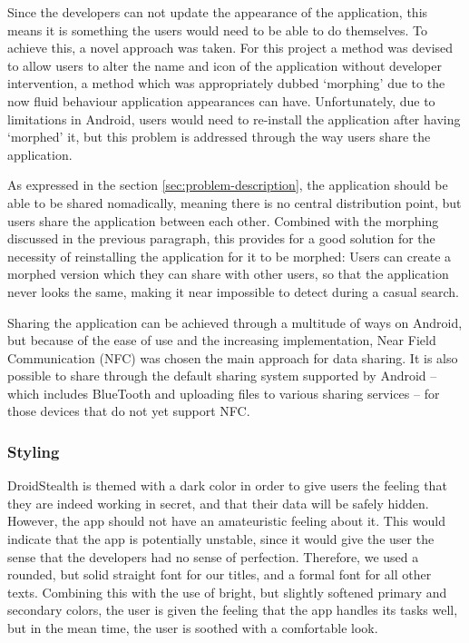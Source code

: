 Since the developers can not update the appearance of the application, this means it is something the users would need to be able to do themselves.
To achieve this, a novel approach was taken.
For this project a method was devised to allow users to alter the name and icon of the application without developer intervention, a method which was appropriately dubbed `morphing' due to the now fluid behaviour application appearances can have.
Unfortunately, due to limitations in Android, users would need to re-install the application after having `morphed' it, but this problem is addressed through the way users share the application.

As expressed in the section \ref{sec:problem-description}, the application should be able to be shared nomadically, meaning there is no central distribution point, but users share the application between each other. 
Combined with the morphing discussed in the previous paragraph, this provides for a good solution for the necessity of reinstalling the application for it to be morphed: 
Users can create a morphed version which they can share with other users, so that the application never looks the same, making it near impossible to detect during a casual search.

Sharing the application can be achieved through a multitude of ways on Android, but because of the ease of use and the increasing implementation, Near Field Communication (NFC)\cite{website:nfc-spec} was chosen the main approach for data sharing. 
It is also possible to share through the default sharing system supported by Android -- which includes BlueTooth and uploading files to various sharing services -- for those devices that do not yet support NFC.

\subsubsection{Styling}

DroidStealth is themed with a dark color in order to give users the feeling that they are indeed
working in secret, and that their data will be safely hidden. However, the app should not
have an amateuristic feeling about it. This would indicate that the app is potentially unstable, 
since it would give the user the sense that the developers had no sense of perfection. 
Therefore, we used a rounded, but solid straight font for our titles, and a formal font for 
all other texts. Combining this with the use of bright, but slightly softened primary and 
secondary colors, the user is given the feeling that the app handles its tasks well, but in 
the mean time, the user is soothed with a comfortable look. %

